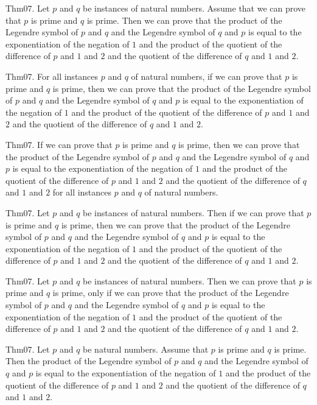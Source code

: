 \documentclass{article}
\begin{document}
Thm07. Let $p$ and $q$ be instances of natural numbers. Assume that we can prove that $p$ is prime and $q$ is prime. Then we can prove that the product of the Legendre symbol of $p$ and $q$ and the Legendre symbol of $q$ and $p$ is equal to the exponentiation of the negation of $1$ and the product of the quotient of the difference of $p$ and $1$ and $2$ and the quotient of the difference of $q$ and $1$ and $2$.

Thm07. For all instances $p$ and $q$ of natural numbers, if we can prove that $p$ is prime and $q$ is prime, then we can prove that the product of the Legendre symbol of $p$ and $q$ and the Legendre symbol of $q$ and $p$ is equal to the exponentiation of the negation of $1$ and the product of the quotient of the difference of $p$ and $1$ and $2$ and the quotient of the difference of $q$ and $1$ and $2$.

Thm07. If we can prove that $p$ is prime and $q$ is prime, then we can prove that the product of the Legendre symbol of $p$ and $q$ and the Legendre symbol of $q$ and $p$ is equal to the exponentiation of the negation of $1$ and the product of the quotient of the difference of $p$ and $1$ and $2$ and the quotient of the difference of $q$ and $1$ and $2$ for all instances $p$ and $q$ of natural numbers.

Thm07. Let $p$ and $q$ be instances of natural numbers. Then if we can prove that $p$ is prime and $q$ is prime, then we can prove that the product of the Legendre symbol of $p$ and $q$ and the Legendre symbol of $q$ and $p$ is equal to the exponentiation of the negation of $1$ and the product of the quotient of the difference of $p$ and $1$ and $2$ and the quotient of the difference of $q$ and $1$ and $2$.

Thm07. Let $p$ and $q$ be instances of natural numbers. Then we can prove that $p$ is prime and $q$ is prime, only if we can prove that the product of the Legendre symbol of $p$ and $q$ and the Legendre symbol of $q$ and $p$ is equal to the exponentiation of the negation of $1$ and the product of the quotient of the difference of $p$ and $1$ and $2$ and the quotient of the difference of $q$ and $1$ and $2$.

Thm07. Let $p$ and $q$ be natural numbers. Assume that $p$ is prime and $q$ is prime. Then the product of the Legendre symbol of $p$ and $q$ and the Legendre symbol of $q$ and $p$ is equal to the exponentiation of the negation of $1$ and the product of the quotient of the difference of $p$ and $1$ and $2$ and the quotient of the difference of $q$ and $1$ and $2$.
\end{document}

